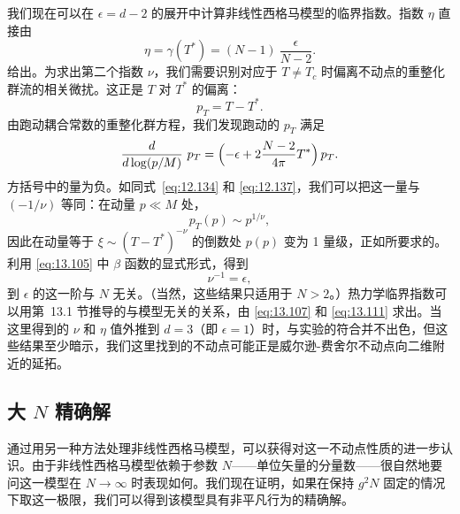 我们现在可以在 $\epsilon = d-2$ 的展开中计算非线性西格马模型的临界指数。指数 $\eta$ 直接由
\begin{equation}
  \eta = \gamma(T^{*}) = (N-1)\ \frac{\epsilon}{N-2} .
  \label{eq:13.107}
\end{equation}
给出。为求出第二个指数 $\nu$，我们需要识别对应于 $T \neq T_c$ 时偏离不动点的重整化群流的相关微扰。这正是 $T$ 对 $T^{*}$ 的偏离：
\begin{equation}
  p_T = T - T^{*} .
  \label{eq:13.108}
\end{equation}
由跑动耦合常数的重整化群方程，我们发现跑动的 $p_T$ 满足
\begin{equation}
  \frac{d}{d\log(p/M)}\ p_T = \Bigl( -\epsilon + 2\frac{N-2}{4\pi}T^{*}
    \Bigr)\,p_T .
  \label{eq:13.109}
\end{equation}
方括号中的量为负。如同式~\eqref{eq:12.134} 和 \eqref{eq:12.137}，我们可以把这一量与 $(-1/\nu)$ 等同：在动量 $p \ll M$ 处，
\begin{equation}
  p_T(p) \sim p^{1/\nu} ,
  \label{eq:13.110}
\end{equation}
因此在动量等于 $\xi \sim (T-T^{*})^{-\nu}$ 的倒数处 $p(p)$ 变为 1 量级，正如所要求的。利用 \eqref{eq:13.105} 中 $\beta$ 函数的显式形式，得到
\begin{equation}
  \nu^{-1} = \epsilon ,
  \label{eq:13.111}
\end{equation}
到 $\epsilon$ 的这一阶与 $N$ 无关。（当然，这些结果只适用于 $N > 2$。）热力学临界指数可以用第~13.1 节推导的与模型无关的关系，由 \eqref{eq:13.107} 和 \eqref{eq:13.111} 求出。当这里得到的 $\nu$ 和 $\eta$ 值外推到 $d = 3$（即 $\epsilon = 1$）时，与实验的符合并不出色，但这些结果至少暗示，我们这里找到的不动点可能正是威尔逊-费舍尔不动点向二维附近的延拓。

\subsection{大 $N$ 精确解}

通过用另一种方法处理非线性西格马模型，可以获得对这一不动点性质的进一步认识。由于非线性西格马模型依赖于参数 $N$——单位矢量的分量数——很自然地要问这一模型在 $N\to\infty$ 时表现如何。我们现在证明，如果在保持 $g^2N$ 固定的情况下取这一极限，我们可以得到该模型具有非平凡行为的精确解。


